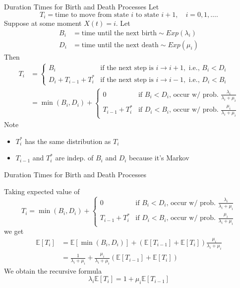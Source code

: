 \documentclass[letterpaper,handout]{beamer}
\def\E{\mathbb E}
\begin{document}
\begin{frame}{Duration Times for Birth and Death Processes}
Let
$$T_i=\mbox{time to move from state }i\mbox{ to state }i+1,\quad i=0,1,\ldots.$$
Suppose at some moment $X(t)=i$.
Let
\begin{align*}
B_i&=\text{time until the next birth}\sim Exp(\lambda_i)\\
D_i&=\text{time until the next death}\sim Exp(\mu_i)
\end{align*}
Then
\begin{align*}
T_i &=
\begin{cases}
B_i &\text{if the next step is }i\to i+1,\text{ i.e., }B_i<D_i\\
D_i+T_{i-1}+T_i^* &\text{if the next step is }i\to i-1,\text{ i.e., }D_i<B_i
\end{cases}\\
&=\min(B_i, D_i)+
\begin{cases}
0 &\text{if }B_i<D_i\text{, occur w/ prob. }\frac{\lambda_i}{\lambda_i+\mu_i}\\
T_{i-1}+T_i^* & \text{if }D_i<B_i\text{, occur w/ prob. }\frac{\mu_i}{\lambda_i+\mu_i}
\end{cases}
\end{align*}
Note
\begin{itemize}
\item $T_i^*$ has the same distribution as $T_i$
\item $T_{i-1}$ and $T_i^*$ are indep. of $B_i$ and $D_i$ because it's Markov
\end{itemize}
\end{frame}
\begin{frame}{Duration Times for Birth and Death Processes}

Taking expected value of
$$
T_i
=\min(B_i, D_i)+
\begin{cases}
0 &\text{if }B_i<D_i\text{, occur w/ prob. }\frac{\lambda_i}{\lambda_i+\mu_i}\\
T_{i-1}+T_i^* & \text{if }D_i<B_i\text{, occur w/ prob. }\frac{\mu_i}{\lambda_i+\mu_i}
\end{cases}
$$
we get
\begin{align*}
\E[T_i]&=\E[\min(B_i, D_i)]+\left(\E[T_{i-1}]+\E[T_i]\right)\frac{\mu_i}{\lambda_i+\mu_i}\\
&=\frac{1}{\lambda_i+\mu_i}+\frac{\mu_i}{\lambda_i+\mu_i}(\E[T_{i-1}]+\E[T_i])
\end{align*}
We obtain the recursive formula
$$
\lambda_i\E[T_i]=1+\mu_i\E[T_{i-1}]
$$
\end{frame}
\end{document}
